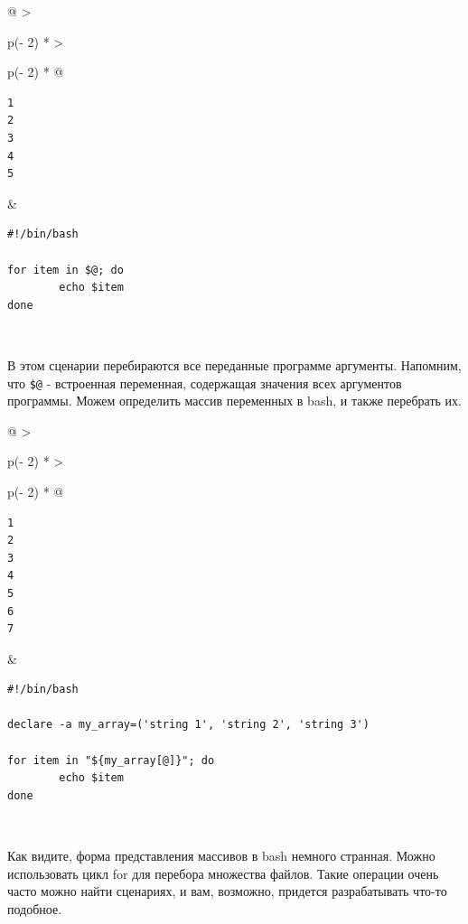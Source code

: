 \documentclass{article}
\begin{document}
\begin{longtable}[]{@{}
  >{\raggedright\arraybackslash}p{(\columnwidth - 2\tabcolsep) * }
  >{\raggedright\arraybackslash}p{(\columnwidth - 2\tabcolsep) * }@{}}
\toprule
\endhead
\begin{minipage}[t]{\linewidth}\raggedright
\begin{verbatim}
1
2
3
4
5
\end{verbatim}
\end{minipage} & \begin{minipage}[t]{\linewidth}\raggedright
\begin{verbatim}
#!/bin/bash

for item in $@; do
        echo $item
done
\end{verbatim}
\end{minipage} \\ \addlinespace
\bottomrule
\end{longtable}

В этом сценарии перебираются все переданные программе аргументы.
Напомним, что \texttt{\$@} - встроенная переменная, содержащая значения
всех аргументов программы. Можем определить массив переменных в bash, и
также перебрать их.

\begin{longtable}[]{@{}
  >{\raggedright\arraybackslash}p{(\columnwidth - 2\tabcolsep) * }
  >{\raggedright\arraybackslash}p{(\columnwidth - 2\tabcolsep) * }@{}}
\toprule
\endhead
\begin{minipage}[t]{\linewidth}\raggedright
\begin{verbatim}
1
2
3
4
5
6
7
\end{verbatim}
\end{minipage} & \begin{minipage}[t]{\linewidth}\raggedright
\begin{verbatim}
#!/bin/bash

declare -a my_array=('string 1', 'string 2', 'string 3')

for item in "${my_array[@]}"; do
        echo $item
done
\end{verbatim}
\end{minipage} \\ \addlinespace
\bottomrule
\end{longtable}

Как видите, форма представления массивов в bash немного странная. Можно
использовать цикл for для перебора множества файлов. Такие операции
очень часто можно найти сценариях, и вам, возможно, придется
разрабатывать что-то подобное.
\end{document}
